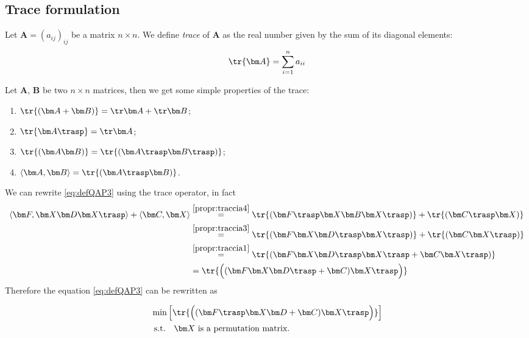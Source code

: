 \subsection{Trace formulation}

\begin{defi}
	Let $\bm A=(a_{ij})_{ij}$ be a matrix $n\times n$. We define \textit{trace} of $\bm A$ as the real number given by the sum of its diagonal elements:
	\[
	\tr{\bm A} = \sum_{i=1}^n a_{ii}
	\]
\end{defi}

\begin{prop}
Let  $\bm A$, $\bm B$ be two  $n \times n$ matrices, then we get some simple properties of the trace:
\begin{enumerate}
	\item $\tr{(\bm A + \bm B)}= \tr \bm A + \tr \bm B$; \label{propr:traccia1}
	\item $\tr{ \bm A\trasp} = \tr \bm A$;\label{propr:traccia2}
	\item $\tr{(\bm A \bm B)} = \tr{(\bm A \trasp \bm B \trasp )}$;\label{propr:traccia3}
	\item $\langle \bm A,\bm B \rangle = \tr{(\bm A\trasp \bm B)}$.\label{propr:traccia4}
\end{enumerate}
\end{prop}
We can rewrite  \eqref{eq:defQAP3} using the trace operator, in fact
\[
\begin{split}
\langle \bm F, \bm X \bm D \bm X\trasp \rangle +  \langle \bm C, \bm X \rangle &\overset{\ref{propr:traccia4}}{=}  \tr{ \left(\bm F \trasp  \bm X \bm B \bm X\trasp\right)} + \tr{\left(\bm C\trasp \bm  X\right)} \\
 &\overset{\ref{propr:traccia3}}{=} \tr{ \left(\bm F   \bm X\bm D\trasp \bm X\trasp\right)} +\tr{\left(\bm C \bm  X\trasp \right)}\\
 &\overset{\ref{propr:traccia1}}{=} \tr{\left(\bm F   \bm X \bm D \trasp \bm X\trasp + \bm C \bm  X \trasp \right)} \\
 &= \tr{\Bigl((\bm F  \bm X \bm D \trasp  + \bm C)\bm X \trasp \Bigr)}
 \end{split}
\]
Therefore the equation \eqref{eq:defQAP3} can be rewritten as
\begin{tcolorbox}[title=Trace formulation]
	\begin{equation}
	\label{eq:QAP_traccia}
	\begin{split}	
	&\min{\left[ \tr{\Bigl((\bm F \trasp  \bm X \bm D + \bm C)\bm X \trasp \Bigr)} \right]} \\
	&\text{ s.t.} \quad \bm X \text{ is a permutation matrix.} \\
	\end{split}
	\end{equation}
\end{tcolorbox}

